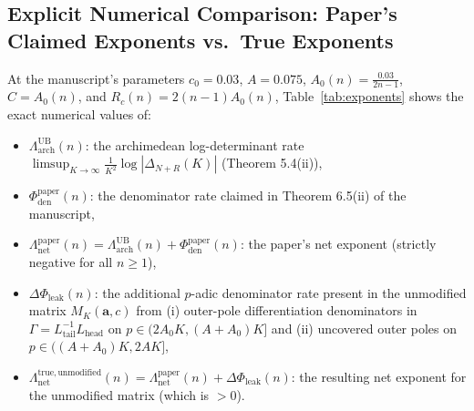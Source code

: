 \documentclass[11pt,a4paper]{article}
\begin{document}
\subsection{Explicit Numerical Comparison: Paper's Claimed Exponents vs.\ True Exponents}

At the manuscript's parameters $c_0 = 0.03$, $A = 0.075$, $A_0(n) = \frac{0.03}{2n-1}$, $C = A_0(n)$, and $R_c(n) = 2(n-1)A_0(n)$, Table~\ref{tab:exponents} shows the exact numerical values of:
\begin{itemize}
  \item $\Lambda_{\mathrm{arch}}^{\mathrm{UB}}(n)$: the archimedean log-determinant rate $\limsup_{K\to\infty}\frac{1}{K^2}\log|\Delta_{N+R}(K)|$ (Theorem 5.4(ii)),
  \item $\Phi_{\mathrm{den}}^{\mathrm{paper}}(n)$: the denominator rate claimed in Theorem 6.5(ii) of the manuscript,
  \item $\Lambda_{\mathrm{net}}^{\mathrm{paper}}(n) = \Lambda_{\mathrm{arch}}^{\mathrm{UB}}(n) + \Phi_{\mathrm{den}}^{\mathrm{paper}}(n)$: the paper's net exponent (strictly negative for all $n \ge 1$),
  \item $\Delta\Phi_{\mathrm{leak}}(n)$: the additional $p$-adic denominator rate present in the unmodified matrix $M_K(\mathbf{a}, c)$ from (i) outer-pole differentiation denominators in $\Gamma = L_{\mathrm{tail}}^{-1}L_{\mathrm{head}}$ on $p \in (2A_0 K, (A+A_0)K]$ and (ii) uncovered outer poles on $p \in ((A+A_0)K, 2AK]$,
  \item $\Lambda_{\mathrm{net}}^{\mathrm{true,unmodified}}(n) = \Lambda_{\mathrm{net}}^{\mathrm{paper}}(n) + \Delta\Phi_{\mathrm{leak}}(n)$: the resulting net exponent for the unmodified matrix (which is $> 0$).
\end{itemize}
\end{document}
